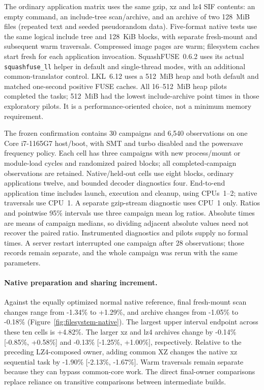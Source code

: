 The ordinary application matrix uses the same gzip, xz and lz4 SIF contents:
an empty command, an include-tree scan/archive, and an archive of two
128~MiB files (repeated text and seeded pseudorandom data). Five-format native
tests use the same logical include tree and 128~KiB blocks, with separate
fresh-mount and subsequent warm traversals. Compressed image pages are warm;
filesystem caches start fresh for each application invocation.
SquashFUSE~0.6.2 uses its actual \texttt{squashfuse\_ll} helper in default and
single-thread modes, with an additional common-translator control.
LKL~6.12 uses a 512~MiB heap and both default and matched one-second positive
FUSE caches. All 16--512~MiB heap pilots completed the tasks; 512~MiB had the
lowest include-archive point times in those exploratory pilots. It is a
performance-oriented choice, not a minimum memory requirement.

The frozen confirmation contains 30 campaigns and 6,540 observations on one
Core i7-1165G7 host/boot, with SMT and turbo disabled and the powersave
frequency policy. Each cell has three campaigns with new process/mount or
module-load cycles and randomized paired blocks; all completed-campaign observations are retained.
Native/held-out cells use eight blocks, ordinary applications twelve, and
bounded decoder diagnostics four. End-to-end application time includes
launch, execution and cleanup, using CPUs~1--2; native traversals use CPU~1.
A separate gzip-stream diagnostic uses CPU~1 only. Ratios and pointwise
95\% intervals use three campaign mean log ratios. Absolute times are means
of campaign medians, so dividing adjacent absolute values need not recover
the paired ratio. Instrumented diagnostics and pilots supply no formal times. A server restart interrupted one campaign after 28 observations; those records remain separate, and the whole campaign was rerun with the same parameters.

\paragraph{Native preparation and sharing increment.}
Against the equally optimized normal native reference, final fresh-mount scan changes range from -1.34\% to +1.29\%, and archive changes from -1.05\% to -0.18\% (Figure~\ref{fig:filesystem-native}). The largest upper interval endpoint across these ten cells is +4.82\%. The larger xz and lz4 archives change by -0.14\% [-0.85\%, +0.58\%] and -0.13\% [-1.25\%, +1.00\%], respectively. Relative to the preceding LZ4-composed owner, adding common XZ changes the native xz sequential task by -1.90\% [-2.13\%, -1.67\%].
Warm traversals remain separate because they can bypass common-core work.
The direct final-owner comparisons replace reliance on transitive comparisons
between intermediate builds.

